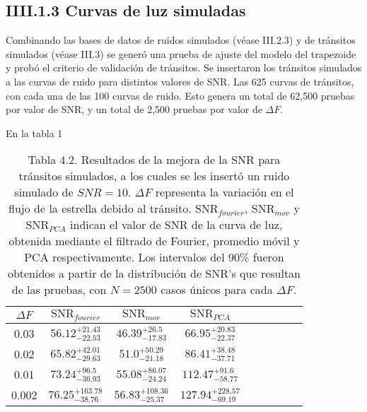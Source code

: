 \subsection*{IIII.1.3 Curvas de luz simuladas}

Combinando las bases de datos de ruidos simulados (véase III.2.3) y de tránsitos simulados (véase III.3) se generó una prueba de ajuste del modelo del trapezoide y probó el criterio de validación de tránsitos. Se insertaron los tránsitos simulados a las curvas de ruido para distintos valores de SNR. Las 625 curvas de tránsitos, con cada una de las 100 curvas de ruido. Esto genera un total de 62,500 pruebas por valor de SNR, y un total de 2,500 pruebas por valor de $\Delta F$.

En la tabla 1

\begin{table}
	\hspace{-1.7cm}
	\begin{footnotesize}
	\begin{tabular}{ccccccccc}
	\hline 
	$\Delta F$ & $\mbox{SNR}_{fourier}$ &  $\mbox{SNR}_{mov}$ & $\mbox{SNR}_{PCA}$\\ 
	\hline
	0.03 & 	${56.12}_{-22.53}^{+21.43}$ & ${46.39}_{-17.83}^{+26.5}$ & ${66.95}_{-22.37}^{+20.83}$ \\
	0.02 &  ${65.82}_{-29.63}^{+42.01}$ & ${51.0}_{-21.18}^{+50.29}$ & ${86.41}_{-37.71}^{+38.48}$ \\
	0.01 & ${73.24}_{-36.93}^{+96.5}$ & ${55.08}_{-24.24}^{+86.07}$ & ${112.47}_{-58.77}^{+91.6}$ \\
	0.002 & ${76.25}_{-38.76}^{+163.78}$ & ${56.83}_{-25.37}^{+108.36}$	& ${127.94}_{-69.19}^{+228.57}$ \\
	\hline 
	\end{tabular} 
	\end{footnotesize}
	\caption{Tabla 4.2. Resultados de la mejora de la SNR para tránsitos simulados, a los cuales se les insertó un ruido simulado de $SNR=10$. $\Delta F$ representa la variación en el flujo de la estrella debido al tránsito. $\mbox{SNR}_{fourier}$, $\mbox{SNR}_{mov}$ y $\mbox{SNR}_{PCA}$ indican el valor de SNR de la curva de luz, obtenida mediante el filtrado de Fourier, promedio móvil y PCA respectivamente. Los intervalos del 90\% fueron obtenidos a partir de la distribución de SNR's que resultan de las pruebas, con $N=2500$ casos únicos para cada $\Delta F$.}
	\end{table}


